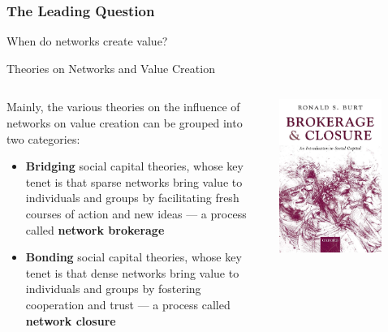 \documentclass[notes, aspectratio=1610]{beamer}
\begin{document}
\begin{frame}
	\frametitle{The Leading Question}
		\begin{center}
			\LARGE When do networks create value?
		\end{center}
\end{frame}

\begin{frame}{Theories on Networks and Value Creation}
\begin{columns}
	\begin{column}{0.5\textwidth}
	Mainly, the various theories on the influence of networks on value 
	creation can be grouped into two categories:

	\vspace{1em}

	\begin{itemize}
		\item \textbf{Bridging} social capital theories, whose key 
		      tenet is that sparse networks bring value to 
		      individuals and groups by facilitating fresh courses 
		      of action and new ideas --- a process called 
		      \textbf{network brokerage} 
		\item \textbf{Bonding} social capital theories, whose key 
		      tenet is that dense networks bring value to 
		      individuals and groups by fostering cooperation and trust
		      ---  a process called \textbf{network closure}
	\end{itemize}
	\end{column}
	\begin{column}{0.5\textwidth}
		\centering
		\includegraphics[width=0.75\textwidth]{images/brokerage_and_closure.jpeg}
	\end{column}
\end{columns}
\end{frame}
\end{document}

